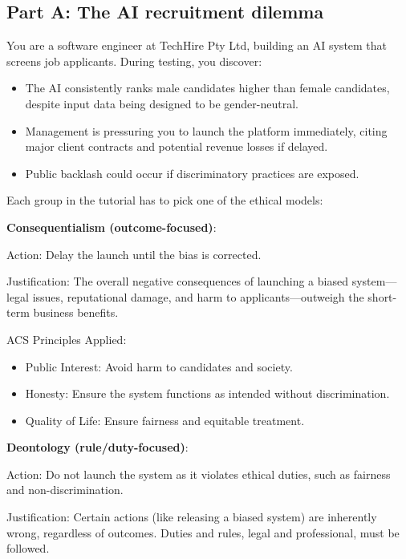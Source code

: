 \subsection{Part A: The AI recruitment dilemma}

\indent

You are a software engineer at TechHire Pty Ltd, building an AI system that screens job applicants. During testing, you discover:

\begin{itemize}
    \item The AI consistently ranks male candidates higher than female candidates, despite input data being designed to be gender-neutral.
    \item Management is pressuring you to launch the platform immediately, citing major client contracts and potential revenue losses if delayed.
    \item Public backlash could occur if discriminatory practices are exposed.
\end{itemize}

\bigskip

Each group in the tutorial has to pick one of the ethical models:

\noindent \textbf{Consequentialism (outcome-focused)}:

Action: Delay the launch until the bias is corrected.

Justification: The overall negative consequences of launching a biased system—legal issues, reputational damage, and harm to applicants—outweigh the short-term business benefits.

ACS Principles Applied:

\begin{itemize}
    \item Public Interest: Avoid harm to candidates and society.
    \item Honesty: Ensure the system functions as intended without discrimination.
    \item Quality of Life: Ensure fairness and equitable treatment.
\end{itemize}

\noindent\textbf{Deontology (rule/duty-focused)}:

Action: Do not launch the system as it violates ethical duties, such as fairness and non-discrimination.

Justification: Certain actions (like releasing a biased system) are inherently wrong, regardless of outcomes. Duties and rules, legal and professional, must be followed.

